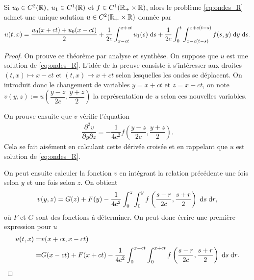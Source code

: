 \documentclass[12pt,a4paper,twoside]{article}
\begin{document}
\begin{theorem}
  \label{thm:d_Alembert}
  Si $u_0 \in C^2(\mathbb{R})$, $u_1 \in C^1(\mathbb{R})$ et $f \in C^1(\mathbb{R}_+ \times \mathbb{R})$,
  alors le probl\`eme \eqref{eq:ondes_R} admet une unique solution 
  $u \in C^2(\mathbb{R}_+ \times \mathbb{R})$ donn\'ee par 
  \begin{align*}
    u(t,x) = \dfrac{u_0(x+ct) + u_0(x-ct)}{2} 
    + \dfrac{1}{2c} \int_{x-ct}^{x+ct} u_1(s) \;\mathrm{d} s
    + \dfrac{1}{2c} \int_0^t \int_{x - c(t-s)}^{x+c(t-s)} f(s,y) \;\mathrm{d} y \;\mathrm{d} s .
  \end{align*}
\end{theorem}



\begin{proof}
  On prouve ce th\'eor\`eme par analyse et synth\`ese.
  On suppose que $u$ est une solution de \eqref{eq:ondes_R}.
  L'id\'ee de la preuve consiste \`a s'int\'eresser aux droites $(t,x) \mapsto x-ct$
  et $(t,x) \mapsto x+ct$ selon lesquelles les ondes se d\'eplacent.
  On introduit donc le changement de variables $y = x+ct$ et $z = x-ct$,
  on note $v(y,z) := u\left(\dfrac{y-z}{2c} , \dfrac{y+z}{2}\right)$ la repr\'esentation
  de $u$ selon ces nouvelles variables.

  On prouve ensuite que $v$ v\'erifie l'\'equation
  \begin{align*}
    \dfrac{\partial^2 v}{\partial y \partial z}
    = - \dfrac{1}{4 c^2} f\left(\dfrac{y-z}{2c} , \dfrac{y+z}{2} \right) .
  \end{align*}
  Cela se fait ais\'ement en calculant cette d\'eriv\'ee crois\'ee et en rappelant que $u$ 
  est solution de \eqref{eq:ondes_R}.

  On peut ensuite calculer la fonction $v$ en int\'egrant la relation pr\'ec\'edente
  une fois selon $y$ et une fois selon $z$.
  On obtient
  \begin{align*}
    v(y,z) = G(z) + F(y)
    - \dfrac{1}{4c^2} \int_0^z \int_0^y f \left(\dfrac{s-r}{2c} , \dfrac{s+r}{2} \right)
    \;\mathrm{d} s \;\mathrm{d} r ,
  \end{align*}
  o\`u $F$ et $G$ sont des fonctions \`a d\'eterminer.
  On peut donc \'ecrire une premi\`ere expression pour $u$
  \begin{align*}
    u(t,x) 
    =& v(x+ct,x-ct)
    \\
    =& G(x-ct) + F(x+ct)
       - \dfrac{1}{4c^2} \int_{0}^{x-ct} \int_0^{x+ct} f\left(\dfrac{s-r}{2c} , \dfrac{s+r}{2}\right) 
       \;\mathrm{d} s \;\mathrm{d} r .
  \end{align*}


\end{proof}
\end{document}
